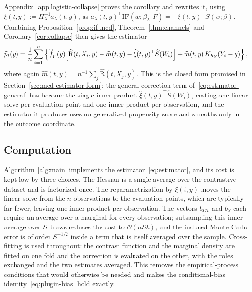 \documentclass[11pt]{article}
\theoremstyle{plain}
\theoremstyle{definition}
\theoremstyle{remark}
\newcommand{\pfhat}[1]{\ensuremath{\,\mathlarger{\widehat{\textit{f}}}_{#1}}}
\newcommand{\DensityRatio}{\text{R}}
\newcommand{\ks}{k}
\newcommand{\cO}{\mathcal{O}}
\newcommand{\IF}{\mathrm{IF}}
\newcommand{\score}{S}
\begin{document}
Appendix~\ref{app:logistic-collapse} proves the corollary and rewrites it, using
$\xi(t,y) := H_\lambda^{-1} a_\lambda(t,y)$, as
$a_\lambda(t,y)^\top \IF(w;\beta_\lambda,F) = -\xi(t,y)^\top \score(w;\beta)$. Combining
Proposition~\ref{prop:if-mcd}, Theorem~\ref{thm:channels} and Corollary~\ref{cor:collapse}
then gives the estimator
\begin{equation}
\widehat p_t(y)
= \frac{1}{n}\sum_{i=1}^{n} \left\{
\pfhat{Y}(y)\Big[
\widehat{\DensityRatio}(t,X_i,y) - \widehat m(t,y)
- \widehat\xi(t,y)^\top \widehat\score(W_i)
\Big]
+ \widehat m(t,y)\, K_{h_Y}(Y_i - y)
\right\},
\label{eq:estimator}
\end{equation}
where again $\widehat m(t,y) = n^{-1}\sum_{j} \widehat{\DensityRatio}(t,X_j,y)$. This is the
closed form promised in Section~\ref{sec:mcd-estimator-form}: the general correction term
of~\eqref{eq:estimator-general} has become the single inner product
$\widehat\xi(t,y)^\top\widehat\score(W_i)$, costing one linear solve per evaluation point and one
inner product per observation, and the estimator it produces uses no generalized propensity score
and smooths only in the outcome coordinate.

\subsection{Computation}
\label{sec:mcd-algorithm}

Algorithm~\ref{alg:main} implements the estimator~\eqref{eq:estimator}, and its cost is kept
low by three choices. The Hessian is a single average over the contrastive dataset and is
factorized once. The reparametrization by $\xi(t,y)$ moves the linear solve from the $n$
observations to the evaluation points, which are typically far fewer, leaving one inner product
per observation. The vectors $b_{TX}$ and $b_Y$ each require an average over a marginal for
every observation; subsampling this inner average over $S$ draws reduces the cost to
$\cO(nS\ks)$, and the induced Monte Carlo error is of order $S^{-1/2}$ inside a term that is
itself averaged over the sample. Cross-fitting \citep{chernozhukov2018} is used throughout: the
contrast function and the marginal density are fitted on one fold and the correction is
evaluated on the other, with the roles exchanged and the two estimates averaged. This removes
the empirical-process conditions that would otherwise be needed and makes the conditional-bias
identity~\eqref{eq:plugin-bias} hold exactly.
\end{document}
